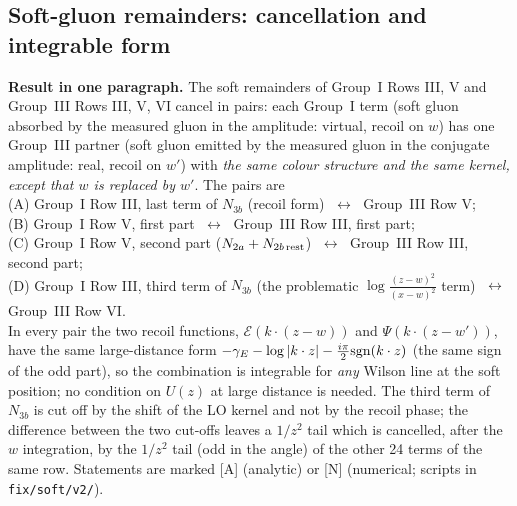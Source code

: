 \documentclass[10pt]{article}
\begin{document}
\subsection{Soft-gluon remainders: cancellation and integrable form}\label{sec:softfix}
\noindent\textbf{Result in one paragraph.} The soft remainders of Group~I Rows III, V and Group~III Rows III, V, VI cancel in pairs: each Group~I term (soft gluon absorbed by the measured gluon in the amplitude: virtual, recoil on $w$) has one Group~III partner (soft gluon emitted by the measured gluon in the conjugate amplitude: real, recoil on $w'$) with \emph{the same colour structure and the same kernel, except that $w$ is replaced by $w'$}. The pairs are\\[2pt]
\hspace*{1em}(A) Group~I Row III, last term of $N_{3b}$ (recoil form) $\;\leftrightarrow\;$ Group~III Row V;\\
\hspace*{1em}(B) Group~I Row V, first part $\;\leftrightarrow\;$ Group~III Row III, first part;\\
\hspace*{1em}(C) Group~I Row V, second part ($N_{2a}+N_{2b\,\rm rest}$) $\;\leftrightarrow\;$ Group~III Row III, second part;\\
\hspace*{1em}(D) Group~I Row III, third term of $N_{3b}$ (the problematic $\log\frac{(z-w)^{2}}{(x-w)^{2}}$ term) $\;\leftrightarrow\;$ Group~III Row VI.\\[2pt]
In every pair the two recoil functions, $\mathcal{E}(k\cdot(z-w))$ and $\Psi(k\cdot(z-w'))$, have the same large-distance form $-\gamma_{E}-\log|k\cdot z|-\frac{i\pi}{2}{\rm sgn}(k\cdot z)$ (the same sign of the odd part), so the combination is integrable for \emph{any} Wilson line at the soft position; no condition on $U(z)$ at large distance is needed. The third term of $N_{3b}$ is cut off by the shift of the LO kernel and not by the recoil phase; the difference between the two cut-offs leaves a $1/z^{2}$ tail which is cancelled, after the $w$ integration, by the $1/z^{2}$ tail (odd in the angle) of the other 24 terms of the same row. Statements are marked [A] (analytic) or [N] (numerical; scripts in \texttt{fix/soft/v2/}).
\end{document}
